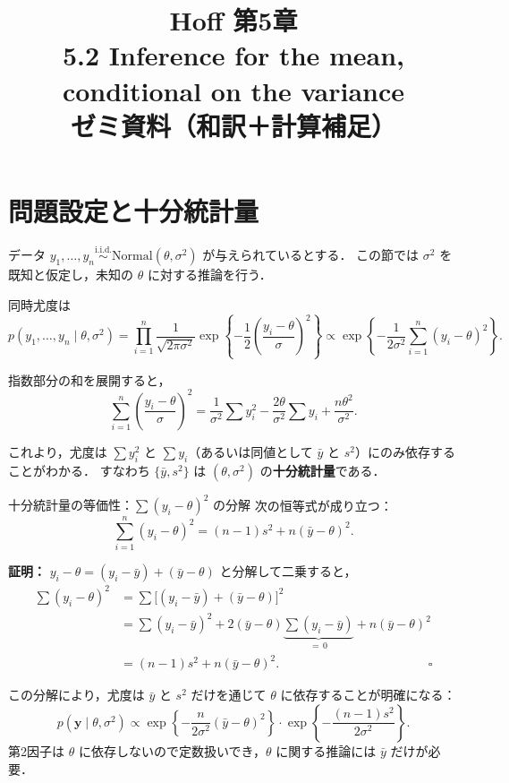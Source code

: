 \documentclass[lualatex,ja=standard,a4paper,12pt]{bxjsarticle}
\title{{\large Hoff 第5章} \\[6pt]
       \textbf{5.2\; Inference for the mean, conditional on the variance} \\[4pt]
       {\normalsize ゼミ資料（和訳＋計算補足）}}
\author{}
\date{}
\begin{document}
\maketitle
\thispagestyle{empty}

\section{問題設定と十分統計量}

データ $y_1, \ldots, y_n \overset{\mathrm{i.i.d.}}{\sim} \mathrm{Normal}(\theta, \sigma^2)$ が与えられているとする．
この節では $\sigma^2$ を既知と仮定し，未知の $\theta$ に対する推論を行う．

同時尤度は
\[
  p(y_1, \ldots, y_n \mid \theta, \sigma^2)
  = \prod_{i=1}^n \frac{1}{\sqrt{2\pi\sigma^2}}
    \exp\!\left\{-\frac{1}{2}\left(\frac{y_i - \theta}{\sigma}\right)^2\right\}
  \propto \exp\!\left\{-\frac{1}{2\sigma^2}\sum_{i=1}^n (y_i - \theta)^2\right\}.
\]

指数部分の和を展開すると，
\[
  \sum_{i=1}^n \left(\frac{y_i - \theta}{\sigma}\right)^2
  = \frac{1}{\sigma^2}\sum y_i^2 - \frac{2\theta}{\sigma^2}\sum y_i + \frac{n\theta^2}{\sigma^2}.
\]

これより，尤度は $\sum y_i^2$ と $\sum y_i$（あるいは同値として $\bar{y}$ と $s^2$）にのみ依存することがわかる．
すなわち $\{\bar{y}, s^2\}$ は $(\theta, \sigma^2)$ の\textbf{十分統計量}である．

\begin{derivbox}{十分統計量の等価性：$\sum(y_i-\theta)^2$ の分解}
次の恒等式が成り立つ：
\[
  \sum_{i=1}^n (y_i - \theta)^2 = (n-1)s^2 + n(\bar{y} - \theta)^2.
\]

\noindent\textbf{証明：} $y_i - \theta = (y_i - \bar{y}) + (\bar{y} - \theta)$ と分解して二乗すると，
\begin{align*}
  \sum(y_i - \theta)^2
  &= \sum\bigl[(y_i - \bar{y}) + (\bar{y} - \theta)\bigr]^2 \\
  &= \sum(y_i - \bar{y})^2
     + 2(\bar{y} - \theta)\underbrace{\sum(y_i - \bar{y})}_{=\,0}
     + n(\bar{y} - \theta)^2 \\
  &= (n-1)s^2 + n(\bar{y} - \theta)^2. \hspace{5cm}\square
\end{align*}

この分解により，尤度は $\bar{y}$ と $s^2$ だけを通じて $\theta$ に依存することが明確になる：
\[
  p(\mathbf{y} \mid \theta, \sigma^2)
  \propto \exp\!\left\{-\frac{n}{2\sigma^2}(\bar{y} - \theta)^2\right\}
  \cdot \exp\!\left\{-\frac{(n-1)s^2}{2\sigma^2}\right\}.
\]
第2因子は $\theta$ に依存しないので定数扱いでき，$\theta$ に関する推論には $\bar{y}$ だけが必要．
\end{derivbox}
\end{document}

